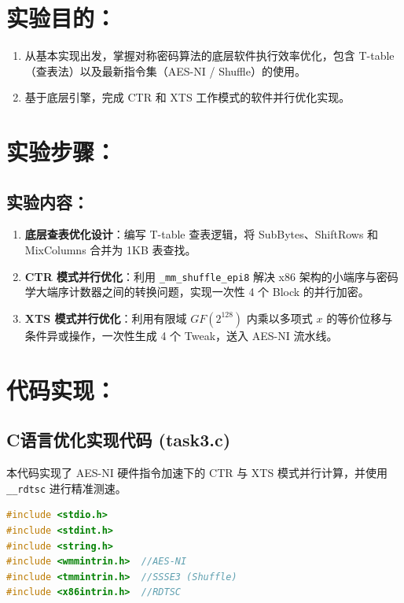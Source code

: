 \documentclass{sdureport}
\begin{document}
\begin{sduDocument}
	\section{实验目的：}
	\begin{enumerate}
		\renewcommand{\labelenumi}{(\theenumi)}
		\item 从基本实现出发，掌握对称密码算法的底层软件执行效率优化，包含 T-table（查表法）以及最新指令集（AES-NI / Shuffle）的使用。
		\item 基于底层引擎，完成 CTR 和 XTS 工作模式的软件并行优化实现。
	\end{enumerate}
	
	\section{实验步骤：}

	\subsection{实验内容：}
	\begin{enumerate}
		\renewcommand{\labelenumi}{(\theenumi)}
		\item \textbf{底层查表优化设计}：编写 T-table 查表逻辑，将 SubBytes、ShiftRows 和 MixColumns 合并为 1KB 表查找。
		\item \textbf{CTR 模式并行优化}：利用 \texttt{\_mm\_shuffle\_epi8} 解决 x86 架构的小端序与密码学大端序计数器之间的转换问题，实现一次性 4 个 Block 的并行加密。
		\item \textbf{XTS 模式并行优化}：利用有限域 $GF(2^{128})$ 内乘以多项式 $x$ 的等价位移与条件异或操作，一次性生成 4 个 Tweak，送入 AES-NI 流水线。
	\end{enumerate} 

	\section{代码实现：}
	\subsection{C语言优化实现代码 (task3.c)}
	本代码实现了 AES-NI 硬件指令加速下的 CTR 与 XTS 模式并行计算，并使用 \texttt{\_\_rdtsc} 进行精准测速。
	\begin{lstlisting}[language=c]
#include <stdio.h>
#include <stdint.h>
#include <string.h>
#include <wmmintrin.h>  //AES-NI
#include <tmmintrin.h>  //SSSE3 (Shuffle)
#include <x86intrin.h>  //RDTSC


\end{lstlisting}
\end{sduDocument}
\end{document}
